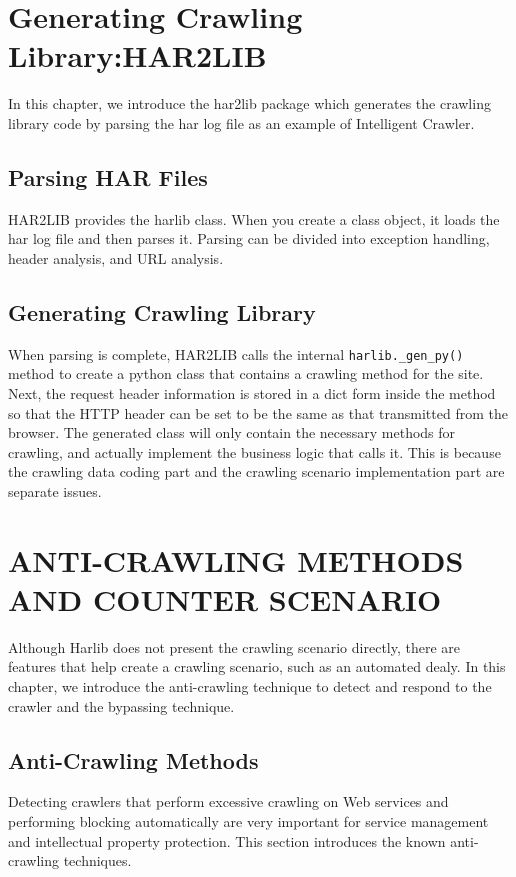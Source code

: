 %
%
\section{Generating Crawling Library:HAR2LIB}
In this chapter, we introduce the har2lib package which generates the crawling library code by parsing the har log file as an example of Intelligent Crawler.

\subsection{Parsing HAR Files}
HAR2LIB provides the harlib class. When you create a class object, it loads the har log file and then parses it. Parsing can be divided into exception handling, header analysis, and URL analysis.

\subsection{Generating Crawling Library}
When parsing is complete, HAR2LIB calls the internal \newline\verb|harlib._gen_py()| method to create a python class that contains a crawling method for the site. Next, the request header information is stored in a dict form inside the method so that the HTTP header can be set to be the same as that transmitted from the browser. The generated class will only contain the necessary methods for crawling, and actually implement the business logic that calls it. This is because the crawling data coding part and the crawling scenario implementation part are separate issues.



%
%
\section{ANTI-CRAWLING METHODS AND COUNTER SCENARIO}
Although Harlib does not present the crawling scenario directly, there are features that help create a crawling scenario, such as an automated dealy. In this chapter, we introduce the anti-crawling technique to detect and respond to the crawler and the bypassing technique.

\subsection{Anti-Crawling Methods}
Detecting crawlers that perform excessive crawling on Web services and performing blocking automatically are very important for service management and intellectual property protection. This section introduces the known anti-crawling techniques.



